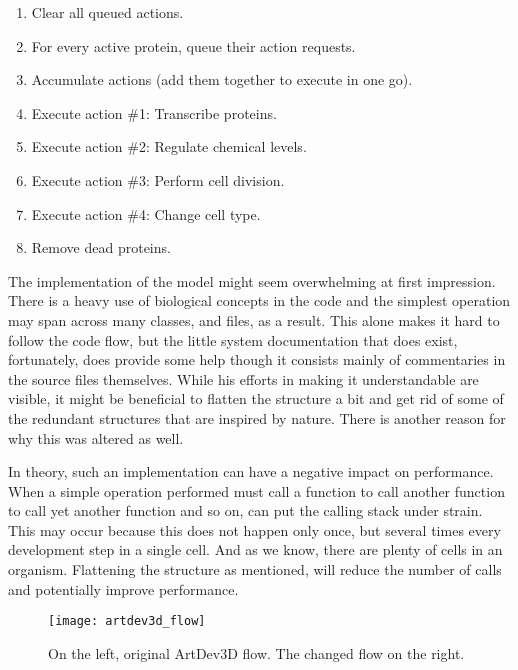 \begin{enumerate}
	\itemsep=0pt
	\item Clear all queued actions.
	\item For every active protein, queue their action requests.
	\item Accumulate actions (add them together to execute in one go).
	\item Execute action \#1: Transcribe proteins.
	\item Execute action \#2: Regulate chemical levels.
	\item Execute action \#3: Perform cell division.
	\item Execute action \#4: Change cell type.
	\item Remove dead proteins.
\end{enumerate}

The implementation of the model might seem overwhelming at first impression. There is a heavy use of biological concepts in the code and the simplest operation may span across many classes, and files, as a result. This alone makes it hard to follow the code flow, but the little system documentation that does exist, fortunately, does provide some help though it consists mainly of commentaries in the source files themselves. While his efforts in making it understandable are visible, it might be beneficial to flatten the structure a bit and get rid of some of the redundant structures that are inspired by nature. There is another reason for why this was altered as well.

In theory, such an implementation can have a negative impact on performance. When a simple operation performed must call a function to call another function to call yet another function and so on, can put the calling stack under strain. This may occur because this does not happen only once, but several times every development step in a single cell. And as we know, there are plenty of cells in an organism. Flattening the structure as mentioned, will reduce the number of calls and potentially improve performance.

\begin{figure}[!ht]
	\centering
	\texttt{[image: artdev3d\_flow]}
	\caption{On the left, original ArtDev3D flow. The changed flow on the right.}
	\label{fig:artdev3d_flow}
\end{figure}

